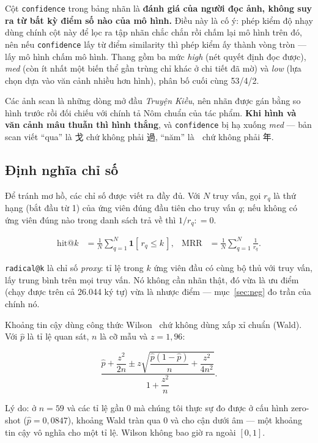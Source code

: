 \documentclass[conference,a4paper]{IEEEtran}
\newcommand{\nom}[1]{{\nomfont #1}}
\newcommand{\code}[1]{{\small\texttt{#1}}}
\begin{document}
Cột \code{confidence} trong bảng nhãn là \textbf{đánh giá của người đọc ảnh, không suy ra từ bất kỳ
điểm số nào của mô hình.} Điều này là cố ý: phép kiểm độ nhạy dùng chính cột này để lọc ra tập nhãn
chắc chắn rồi chấm lại mô hình trên đó, nên nếu \code{confidence} lấy từ điểm similarity thì phép
kiểm ấy thành vòng tròn --- lấy mô hình chấm mô hình. Thang gồm ba mức \emph{high} (nét quyết định
đọc được), \emph{med} (còn ít nhất một biến thể gần trùng chỉ khác ở chi tiết đã mờ) và \emph{low}
(lựa chọn dựa vào văn cảnh nhiều hơn hình), phân bố cuối cùng 53/4/2.

Các ảnh scan là những dòng mở đầu \emph{Truyện Kiều}, nên nhãn được gán bằng so hình trước rồi đối
chiếu với chính tả Nôm chuẩn của tác phẩm. \textbf{Khi hình và văn cảnh mâu thuẫn thì hình thắng},
và \code{confidence} bị hạ xuống \emph{med} --- bản scan viết ``qua'' là \nom{戈} chứ không phải
\nom{過}, ``năm'' là \nom{𢆥} chứ không phải \nom{年}.

\subsection{Định nghĩa chỉ số}

Để tránh mơ hồ, các chỉ số được viết ra đầy đủ. Với $N$ truy vấn, gọi $r_q$ là thứ hạng (bắt đầu từ
1) của ứng viên đúng đầu tiên cho truy vấn $q$; nếu không có ứng viên đúng nào trong danh sách trả
về thì $1/r_q \mathrel{:}= 0$.

\begin{align}
\text{hit@}k &= \frac{1}{N}\sum_{q=1}^{N} \mathbf{1}[\,r_q \leq k\,],
& \text{MRR} &= \frac{1}{N}\sum_{q=1}^{N} \frac{1}{r_q}.
\end{align}

\code{radical@k} là chỉ số \emph{proxy}: tỉ lệ trong $k$ ứng viên đầu có cùng bộ thủ với truy vấn,
lấy trung bình trên mọi truy vấn. Nó không cần nhãn thật, đó vừa là ưu điểm (chạy được trên cả
26.044 ký tự) vừa là nhược điểm --- mục~\ref{sec:neg} đo trần của chính nó.

Khoảng tin cậy dùng công thức Wilson~\cite{wilson} chứ không dùng xấp xỉ chuẩn (Wald). Với $\hat{p}$
là tỉ lệ quan sát, $n$ là cỡ mẫu và $z = 1{,}96$:

\begin{equation}
\label{eq:wilson}
\frac{\hat{p} + \dfrac{z^2}{2n} \pm z\sqrt{\dfrac{\hat{p}(1-\hat{p})}{n} + \dfrac{z^2}{4n^2}}}
     {1 + \dfrac{z^2}{n}} .
\end{equation}

Lý do: ở $n = 59$ và các tỉ lệ gần 0 mà chúng tôi thực sự đo được ở cấu hình zero-shot
($\hat{p} = 0{,}0847$), khoảng Wald tràn qua 0 và cho cận dưới âm --- một khoảng tin cậy vô nghĩa
cho một tỉ lệ. Wilson không bao giờ ra ngoài $[0,1]$.
\end{document}
